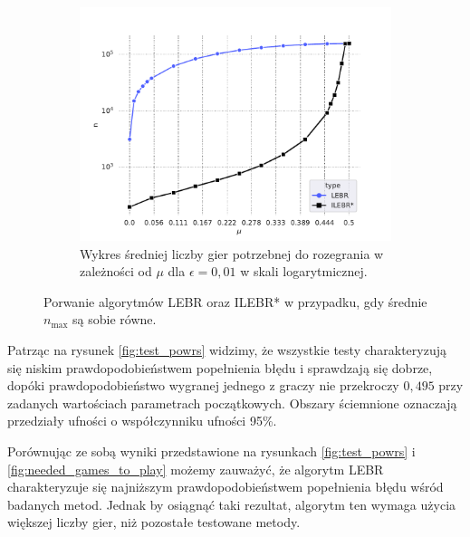 \documentclass[inzynierska]{pwr_wmat_praca_dyplomowa}
\theoremstyle{plain}
\numberwithin{theorem}{chapter}
\theoremstyle{definition}
\numberwithin{theorem}{chapter}
\newcommand{\nmax}{n_{\text{max}}}
\begin{document}
\begin{figure}
\begin{subfigure}{.5\textwidth}
		\end{subfigure}%
		\begin{subfigure}[r]{.5\textwidth}
			\centering
			\includegraphics[width=1\linewidth]{imagens/needed_games_to_play_same_n_max_log.pdf}
			\caption{Wykres średniej liczby gier potrzebnej do rozegrania w zależności od $\mu$ dla $\epsilon=0,01$ w skali logarytmicznej.}
			\label{fig:game_to_play_same_n_max}
		\end{subfigure}
		\caption{Porwanie algorytmów LEBR oraz ILEBR* w przypadku, gdy średnie $\nmax$ są sobie równe.}
		\label{fig:same_n_max}
	\end{figure}
	Patrząc na rysunek \ref{fig:test_powrs} widzimy, że wszystkie testy charakteryzują się niskim prawdopodobieństwem popełnienia błędu i sprawdzają się dobrze, dopóki prawdopodobieństwo wygranej jednego z graczy nie przekroczy $0,495$ przy zadanych wartościach parametrach początkowych. Obszary ściemnione oznaczają przedziały ufności o współczynniku ufności 95\%.
	
%	
	Porównując ze sobą wyniki przedstawione na rysunkach \ref{fig:test_powrs} i \ref{fig:needed_games_to_play} możemy zauważyć, że algorytm LEBR charakteryzuje się najniższym prawdopodobieństwem popełnienia błędu wśród badanych metod.
	Jednak by osiągnąć taki rezultat, algorytm ten wymaga użycia większej liczby gier, niż pozostałe testowane metody.
	
\end{document}
